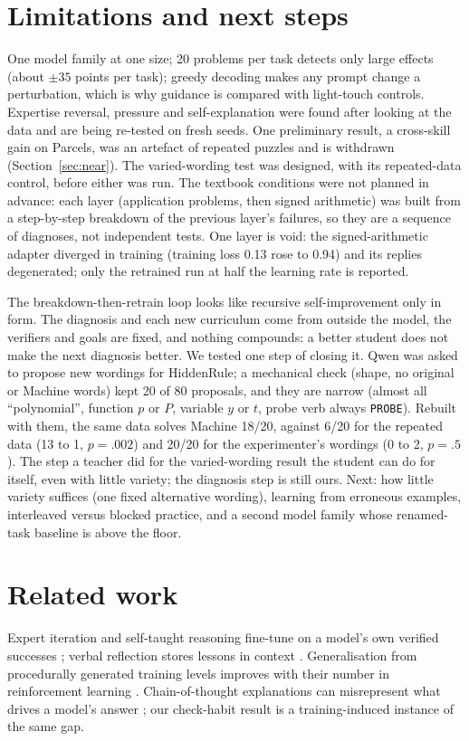 \documentclass[11pt]{article}
\begin{document}
\section{Limitations and next steps}
One model family at one size; 20 problems per task detects only large effects (about $\pm35$ points per task);
greedy decoding makes any prompt change a perturbation, which is why guidance is compared with light-touch
controls. Expertise reversal, pressure and self-explanation were found after looking at the data and are being
re-tested on fresh seeds. One preliminary result, a cross-skill gain on Parcels, was an artefact of repeated
puzzles and is withdrawn (Section~\ref{sec:near}). The varied-wording test was designed, with its repeated-data control, before either was
run. The textbook conditions were not planned in advance: each layer (application problems, then signed arithmetic)
was built from a step-by-step breakdown of the previous layer's failures, so they are a sequence of diagnoses, not
independent tests. One layer is void: the signed-arithmetic adapter diverged in training (training loss 0.13 rose to
0.94) and its replies degenerated; only the retrained run at half the learning rate is reported.

The breakdown-then-retrain loop looks like recursive self-improvement only in form. The diagnosis and each new
curriculum come from outside the model, the verifiers and goals are fixed, and nothing compounds: a better student
does not make the next diagnosis better. We tested one step of closing it. Qwen was asked to propose new wordings for
HiddenRule; a mechanical check (shape, no original or Machine words) kept 20 of 80 proposals, and they are narrow
(almost all ``polynomial'', function $p$ or $P$, variable $y$ or $t$, probe verb always \texttt{PROBE}). Rebuilt with
them, the same data solves Machine 18/20, against 6/20 for the repeated data (13 to 1, $p=.002$) and 20/20 for the
experimenter's wordings (0 to 2, $p=.5$). The step a teacher did for the varied-wording result the student can do
for itself, even with little variety; the diagnosis step is still ours. Next: how little variety suffices (one fixed
alternative wording), learning from erroneous examples, interleaved versus blocked practice, and a second model family
whose renamed-task baseline is above the floor.

\section{Related work}
Expert iteration and self-taught reasoning fine-tune on a model's own verified successes
\citep{anthony2017,zelikman2022}; verbal reflection stores lessons in context \citep{shinn2023}. Generalisation from
procedurally generated training levels improves with their number in reinforcement learning \citep{cobbe2019}.
Chain-of-thought explanations can misrepresent what drives a model's answer \citep{turpin2023}; our check-habit
result is a training-induced instance of the same gap.



\end{document}
